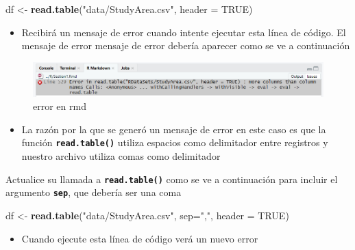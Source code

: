 \documentclass[
]{book}
\newenvironment{Shaded}{\begin{snugshade}}{\end{snugshade}}
\newcommand{\AttributeTok}[1]{\textcolor[rgb]{0.13,0.29,0.53}{#1}}
\newcommand{\ConstantTok}[1]{\textcolor[rgb]{0.56,0.35,0.01}{#1}}
\newcommand{\FunctionTok}[1]{\textcolor[rgb]{0.13,0.29,0.53}{\textbf{#1}}}
\newcommand{\NormalTok}[1]{#1}
\newcommand{\OtherTok}[1]{\textcolor[rgb]{0.56,0.35,0.01}{#1}}
\newcommand{\StringTok}[1]{\textcolor[rgb]{0.31,0.60,0.02}{#1}}
\providecommand{\tightlist}{%
  \setlength{\itemsep}{0pt}\setlength{\parskip}{0pt}}
\begin{document}
\begin{Shaded}
\begin{Highlighting}[]
\NormalTok{df }\OtherTok{\textless{}{-}} \FunctionTok{read.table}\NormalTok{(}\StringTok{"data/StudyArea.csv"}\NormalTok{, }\AttributeTok{header =} \ConstantTok{TRUE}\NormalTok{)}
\end{Highlighting}
\end{Shaded}

\begin{itemize}
\tightlist
\item
  Recibirá un mensaje de error cuando intente ejecutar esta línea de código. El mensaje de error mensaje de error debería aparecer como se ve a continuación
\end{itemize}

\begin{figure}

{\centering \includegraphics[width=0.7\linewidth]{images/error} 

}

\caption{error en rmd}\label{fig:fig-3}
\end{figure}

\begin{itemize}
\tightlist
\item
  La razón por la que se generó un mensaje de error en este caso es que la función \textbf{\texttt{read.table()}} utiliza espacios como delimitador entre registros y nuestro archivo utiliza comas como delimitador
\end{itemize}

Actualice su llamada a \textbf{\texttt{read.table()}} como se ve a continuación para incluir el argumento \textbf{\texttt{sep}}, que debería ser una coma

\begin{Shaded}
\begin{Highlighting}[]
\NormalTok{df }\OtherTok{\textless{}{-}} \FunctionTok{read.table}\NormalTok{(}\StringTok{"data/StudyArea.csv"}\NormalTok{, }\AttributeTok{sep=}\StringTok{","}\NormalTok{, }\AttributeTok{header =} \ConstantTok{TRUE}\NormalTok{)}
\end{Highlighting}
\end{Shaded}

\begin{itemize}
\tightlist
\item
  Cuando ejecute esta línea de código verá un nuevo error
\end{itemize}
\end{document}
